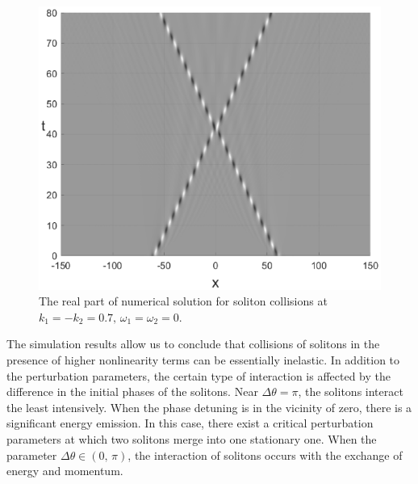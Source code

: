 \documentclass[preprint,12pt]{elsarticle}
\begin{document}
\begin{figure}[H]
\begin{minipage}[h]{0.32\linewidth}
\includegraphics[width=1\linewidth]{fig60g.eps}
\end{minipage}
\caption{The real part of numerical solution for soliton collisions at \(k_{1}=-k_{2}=0.7,\,\omega_{1}=\omega_{2}=0\).}
\label{fig51}
\end{figure}

The simulation results allow us to conclude that collisions of solitons in the presence of higher nonlinearity terms can be essentially inelastic. In addition to the perturbation parameters, the certain type of interaction is affected by the difference in the initial phases of the solitons. Near \(\Delta \theta=\pi\), the solitons interact the least intensively. When the phase detuning is in the vicinity of zero, there is a significant energy emission. In this case, there exist a critical perturbation parameters at which two solitons merge into one stationary one. When the parameter \(\Delta \theta \in (0,\,\pi)\), the interaction of solitons occurs with the exchange of energy and momentum.
\end{document}
